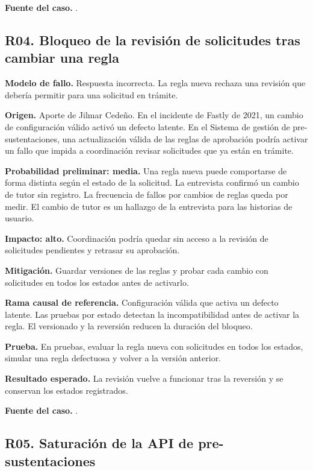 \textbf{Fuente del caso.} \cite{EngineeringAtMeta2021Outage}.

\subsection{R04. Bloqueo de la revisión de solicitudes tras cambiar una regla}

\textbf{Modelo de fallo.} Respuesta incorrecta. La regla nueva rechaza una revisión que debería permitir para una solicitud en trámite.

\textbf{Origen.} Aporte de Jilmar Cedeño. En el incidente de Fastly de 2021, un cambio de configuración válido activó un defecto latente. En el Sistema de gestión de pre-sustentaciones, una actualización válida de las reglas de aprobación podría activar un fallo que impida a coordinación revisar solicitudes que ya están en trámite.

\textbf{Probabilidad preliminar: media.} Una regla nueva puede comportarse de forma distinta según el estado de la solicitud. La entrevista confirmó un cambio de tutor sin registro. La frecuencia de fallos por cambios de reglas queda por medir. El cambio de tutor es un hallazgo de la entrevista para las historias de usuario.

\textbf{Impacto: alto.} Coordinación podría quedar sin acceso a la revisión de solicitudes pendientes y retrasar su aprobación.

\textbf{Mitigación.} Guardar versiones de las reglas y probar cada cambio con solicitudes en todos los estados antes de activarlo.

\textbf{Rama causal de referencia.} Configuración válida que activa un defecto latente. Las pruebas por estado detectan la incompatibilidad antes de activar la regla. El versionado y la reversión reducen la duración del bloqueo.

\textbf{Prueba.} En pruebas, evaluar la regla nueva con solicitudes en todos los estados, simular una regla defectuosa y volver a la versión anterior.

\textbf{Resultado esperado.} La revisión vuelve a funcionar tras la reversión y se conservan los estados registrados.

\textbf{Fuente del caso.} \cite{Rockwell2021FastlyOutage}.

\subsection{R05. Saturación de la API de pre-sustentaciones}

